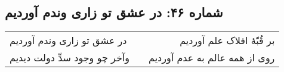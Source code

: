 \begin{center}
\section*{شماره ۴۶: در عشق تو زاری وندم آوردیم}
\label{sec:046}
\begin{longtable}{l p{0.5cm} r}
در عشق تو زاری وندم آوردیم
&&
بر قُبّهٔ افلاک علم آوردیم
\\
وآخر چو وجود سدِّ دولت دیدیم
&&
روی از همه عالم به عدم آوردیم
\\
\end{longtable}
\end{center}
